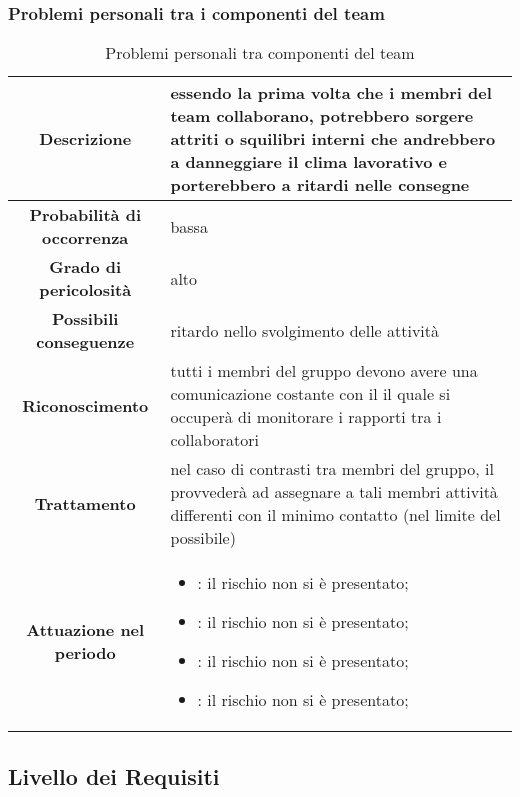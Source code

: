 \documentclass[PianoDiProgetto.tex]{subfiles}
\begin{document}
\clearpage	
	
		\subsubsection{Problemi personali tra i componenti del team}
			\label{sec:pptc}
\begin{table}[h]
		\begin{center}
			\begin{tabular}{ | c | p{10cm} |}
				\hline				
			

		 \textbf{Descrizione} & essendo la prima volta che i membri del team collaborano, potrebbero sorgere attriti o squilibri interni che andrebbero a danneggiare il clima lavorativo e porterebbero a ritardi nelle consegne \\ \hline
		 \textbf{Probabilità di occorrenza} & bassa \\ \hline
		 \textbf{Grado di pericolosità} & alto \\ \hline
		 \textbf{Possibili conseguenze} & ritardo nello svolgimento delle attività \\ \hline
		 \textbf{Riconoscimento} & tutti i membri del gruppo devono avere una comunicazione costante con il \RESP{} il quale si occuperà di monitorare i rapporti tra i collaboratori \\ \hline
		 \textbf{Trattamento} & nel caso di contrasti tra membri del gruppo, il \RESP{} provvederà ad assegnare a tali membri attività differenti con il minimo contatto (nel limite del possibile) \\ \hline
		 \textbf{Attuazione nel periodo} &
		\begin{itemize}
				\item \PerAR : il rischio non si è presentato;
				\item \PerAD: il rischio non si è presentato;
				\item \PerPA: il rischio non si è presentato;
				\item \PerPD: il rischio non si è presentato;
		\end{itemize}
		\\ \hline
	
\end{tabular}
		\caption{Problemi personali tra componenti del team}
		\end{center}	
	\end{table}		

\clearpage		
	\subsection{Livello dei Requisiti}
\end{document}
